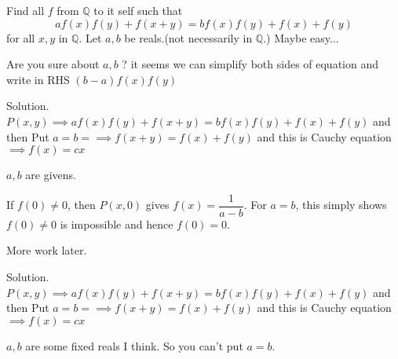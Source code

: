 \begin{solution}
	\begin{tcolorbox}Find all $f$ from $\mathbb{Q}$ to it self such that
\[af(x)f(y)+f(x+y)=bf(x)f(y)+f(x)+f(y)\]
for all $x,y$ in  $\mathbb{Q}$. Let $a,b$ be reals.(not necessarily in $\mathbb{Q}$.)
Maybe easy...\end{tcolorbox}
Are you sure about $a,b$ ? it seems we can simplify both sides of equation and write in RHS $(b-a)f(x)f(y)$
\end{solution}



\begin{solution}
	Solution.    $P(x,y)\implies af(x)f(y)+f(x+y)=bf(x)f(y)+f(x)+f(y)$
 and then Put $a=b=\implies f(x+y)=f(x)+f(y)$ and this is Cauchy equation $\implies f(x)=cx$
\end{solution}



\begin{solution}
	$a,b$ are givens.

If $f(0) \neq 0$, then $P(x,0)$ gives $f(x) = \dfrac{1}{a - b}$. For $a = b$, this simply shows $f(0) \neq 0$ is impossible and hence $f(0) = 0$.

More work later.
\end{solution}



\begin{solution}
	\begin{tcolorbox}Solution.    $P(x,y)\implies af(x)f(y)+f(x+y)=bf(x)f(y)+f(x)+f(y)$
 and then Put $a=b=\implies f(x+y)=f(x)+f(y)$ and this is Cauchy equation $\implies f(x)=cx$\end{tcolorbox}
$a,b$ are some fixed reals I think. So you can't put $a=b$.
\end{solution}



